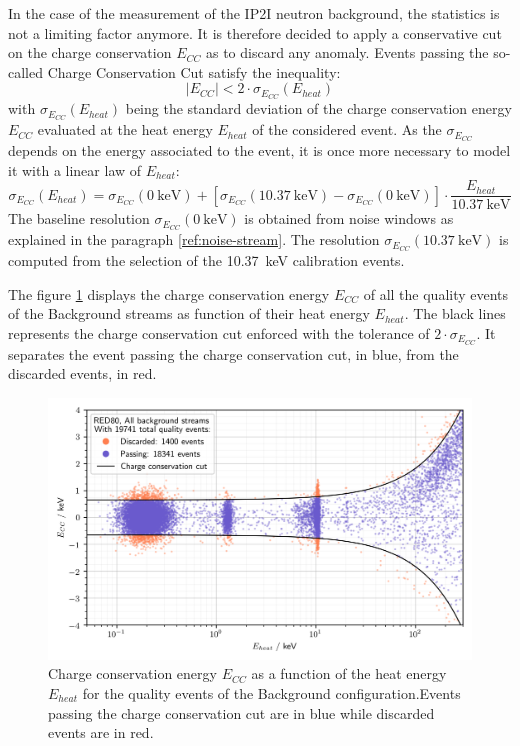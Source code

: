 In the case of the measurement of the IP2I neutron background, the statistics is not a limiting factor anymore. It is therefore decided to apply a conservative cut on the charge conservation $E_{CC}$ as to discard any anomaly. Events passing the so-called Charge Conservation Cut satisfy the inequality:
\begin{equation}
\left\vert E_{CC} \right\vert < 2 \cdot \sigma_{E_{CC}} \left( E_{heat} \right)
\end{equation}
with $\sigma_{E_{CC}} \left( E_{heat} \right)$ being the standard deviation of the charge conservation energy $E_{CC}$ evaluated at the heat energy $E_{heat}$ of the considered event.
As the $\sigma_{E_{CC}}$ depends on the energy associated to the event, it is once more necessary to model it with a linear law of $E_{heat}$:
\begin{equation}
\sigma_{E_{CC}} \left( E_{heat} \right)
=
\sigma_{E_{CC}}(\SI{0}{\kilo\eV})
+
\left[ \sigma_{E_{CC}}(\SI{10.37}{\kilo\eV}) - \sigma_{E_{CC}}(\SI{0}{\kilo\eV}) \right]
\cdot 
\frac{
E_{heat}
}{
\SI{10.37}{\kilo\eV}
}
\end{equation}
The baseline resolution $\sigma_{E_{CC}}(\SI{0}{\kilo\eV})$ is obtained from noise windows as explained in the paragraph \ref{ref:noise-stream}. The resolution $\sigma_{E_{CC}}(\SI{10.37}{\kilo\eV})$ is computed from the selection of the \SI{10.37}{\kilo\eV} calibration events.

The figure \ref{fig:charge-conservation} displays the charge conservation energy $E_{CC}$ of all the quality events of the Background streams as function of their heat energy $E_{heat}$. The black lines represents the charge conservation cut enforced with the tolerance of $2 \cdot \sigma_{E_{CC}}$. It separates the event passing the charge conservation cut, in blue, from the discarded events, in red.

\begin{figure}
\centering
\includegraphics[scale=1]{Figures/Neutron/charge_conservation.png}
\caption{Charge conservation energy $E_{CC}$ as a function of the heat energy $E_{heat}$ for the quality events of the Background configuration.Events passing the charge conservation cut are in blue while discarded events are in red.}
\label{fig:charge-conservation}
\end{figure}

